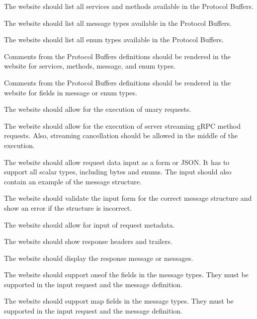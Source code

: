 The website should list all services and methods available in the Protocol Buffers.

The website should list all message types available in the Protocol Buffers.

The website should list all enum types available in the Protocol Buffers.

Comments from the Protocol Buffers definitions should be rendered in the website for services, methods, message, and enum types.

Comments from the Protocol Buffers definitions should be rendered in the website for fields in message or enum types.

The website should allow for the execution of unary requests.

The website should allow for the execution of server streaming gRPC method requests.
Also, streaming cancellation should be allowed in the middle of the execution.

The website should allow request data input as a form or JSON\@.
It has to support all scalar types, including bytes and enums.
The input should also contain an example of the message structure.

The website should validate the input form for the correct message structure and show an error if the structure is incorrect.

The website should allow for input of request metadata.

The website should show response headers and trailers.

The website should display the response message or messages.

The website should support oneof the fields in the message types.
They must be supported in the input request and the message definition.

The website should support map fields in the message types.
They must be supported in the input request and the message definition.

